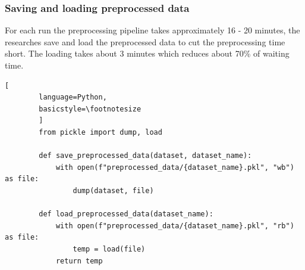 \documentclass[12pt]{diazessay}
\begin{document}
        \subsubsection{Saving and loading preprocessed data}
        For each run the preprocessing pipeline takes approximately 16 - 20 minutes, the researches save and load the preprocessed data to cut the preprocessing time short. The loading takes about 3 minutes which reduces about 70\% of waiting time. 
        \begin{lstlisting}[
        language=Python,
        basicstyle=\footnotesize
        ]
        from pickle import dump, load

        def save_preprocessed_data(dataset, dataset_name):
            with open(f"preprocessed_data/{dataset_name}.pkl", "wb") as file:
                dump(dataset, file)
        
        def load_preprocessed_data(dataset_name):
            with open(f"preprocessed_data/{dataset_name}.pkl", "rb") as file:
                temp = load(file)
            return temp
        \end{lstlisting}
        
        
\end{document}

